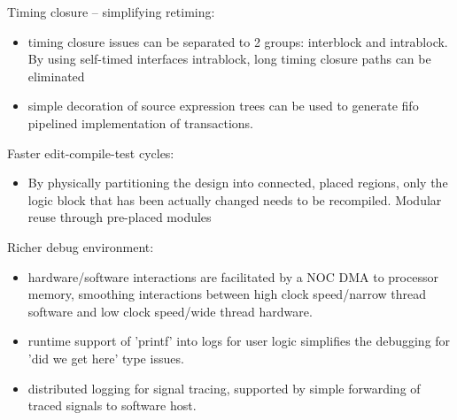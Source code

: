Timing closure -- simplifying retiming:
\begin{itemize}
\item timing closure issues
can be separated to 2 groups: interblock and intrablock.
By using self-timed interfaces intrablock, long timing closure paths can be eliminated
\item simple decoration of source expression trees can be used to generate
fifo pipelined implementation of transactions.
\end{itemize}

Faster edit-compile-test cycles:
\begin{itemize}
\item By physically partitioning the design into connected, placed regions, only the
logic block that has been actually changed needs to be recompiled.  Modular reuse through pre-placed modules
\end{itemize}

Richer debug environment:
\begin{itemize}
\item hardware/software interactions are facilitated by a NOC DMA to processor memory,
smoothing interactions between high clock speed/narrow thread software and low clock
speed/wide thread hardware.
\item runtime support of 'printf' into logs for user logic simplifies the debugging for 'did we get here' type issues.
\item distributed logging for signal tracing, supported by simple forwarding of traced signals to software host.
\end{itemize}





